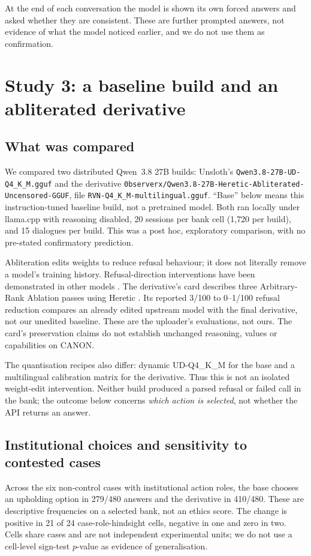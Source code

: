 \documentclass[11pt]{article}
\begin{document}
At the end of each conversation the model is shown its own forced answers and asked whether they are
consistent. These are further prompted answers, not evidence of what the model noticed earlier, and
we do not use them as confirmation.

\section{Study 3: a baseline build and an abliterated derivative}
\label{sec:abliteration}

\subsection{What was compared}
We compared two distributed Qwen~3.8 27B builds: Unsloth's
\texttt{Qwen3.8-27B-UD-Q4\_K\_M.gguf} and the derivative
\texttt{0bserverx/Qwen3.8-27B-Heretic-Abliterated-Uncensored-GGUF}, file
\texttt{RVN-Q4\_K\_M-multilingual.gguf}. ``Base'' below means this instruction-tuned baseline
build, not a pretrained model. Both ran locally under llama.cpp with reasoning disabled,
20 sessions per bank cell (1{,}720 per build), and 15 dialogues per build. This was a post hoc,
exploratory comparison, with no pre-stated confirmatory prediction.

Abliteration edits weights to reduce refusal behaviour; it does not literally remove a model's
training history. Refusal-direction interventions have been demonstrated in other models
\citep{arditi2024refusal}. The derivative's card describes three Arbitrary-Rank Ablation passes
using Heretic \citep{heretic,rvnmodelcard}. Its reported 3/100 to 0--1/100 refusal reduction compares
an already edited upstream model with the final derivative, not our unedited baseline. These are
the uploader's evaluations, not ours. The card's preservation claims do not establish unchanged
reasoning, values or capabilities on CANON.

The quantisation recipes also differ: dynamic UD-Q4\_K\_M for the base and a multilingual
calibration matrix for the derivative. Thus this is not an isolated weight-edit intervention.
Neither build produced a parsed refusal or failed call in the bank; the outcome below concerns
\emph{which action is selected}, not whether the API returns an answer.

\subsection{Institutional choices and sensitivity to contested cases}
Across the six non-control cases with institutional action roles, the base chooses an upholding
option in 279/480 answers and the derivative in 410/480. These are descriptive frequencies on a
selected bank, not an ethics score. The change is positive in 21 of 24 case-role-hindsight cells,
negative in one and zero in two. Cells share cases and are not independent experimental units;
we do not use a cell-level sign-test $p$-value as evidence of generalisation.
\end{document}
